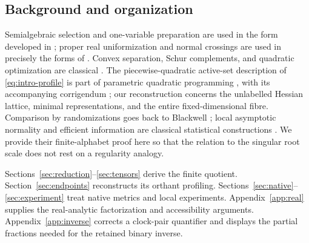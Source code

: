 \documentclass[11pt,reqno]{amsart}
\numberwithin{equation}{section}
\theoremstyle{definition}
\theoremstyle{remark}
\begin{document}
\subsection*{Background and organization}
Semialgebraic selection and one-variable preparation are used in the form developed in \cite{BCR}; proper real uniformization and normal crossings are used in precisely the forms of \cite[Theorem 0.1 and Corollary 4.9]{BM}. Convex separation, Schur complements, and quadratic optimization are classical \cite{BV}. The piecewise-quadratic active-set description of \eqref{eq:intro-profile} is part of parametric quadratic programming \cite{BMDP}, with its accompanying corrigendum \cite{BMDPc}; our reconstruction concerns the unlabelled Hessian lattice, minimal representations, and the entire fixed-dimensional fibre. Comparison by randomizations goes back to Blackwell \cite{Blackwell}; local asymptotic normality and efficient information are classical statistical constructions \cite{vdV}. We provide their finite-alphabet proof here so that the relation to the singular root scale does not rest on a regularity analogy.

Sections~\ref{sec:reduction}--\ref{sec:tensors} derive the finite quotient. Section~\ref{sec:endpoints} reconstructs its orthant profiling. Sections~\ref{sec:native}--\ref{sec:experiment} treat native metrics and local experiments. Appendix~\ref{app:real} supplies the real-analytic factorization and accessibility arguments. Appendix~\ref{app:inverse} corrects a clock-pair quantifier and displays the partial fractions needed for the retained binary inverse.








\end{document}
